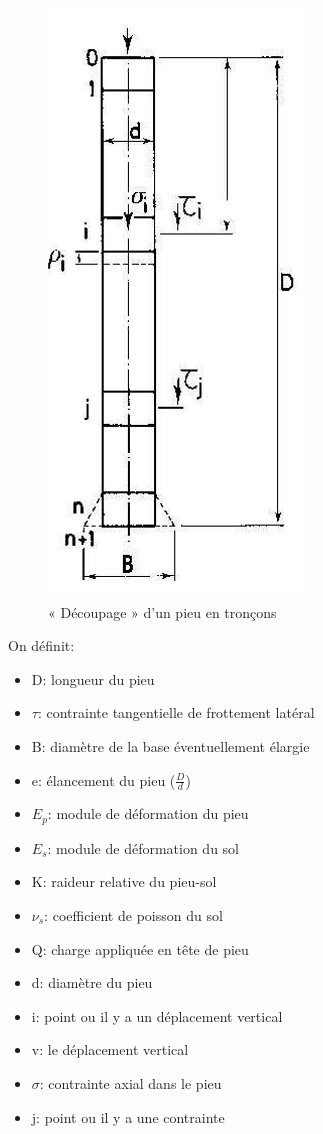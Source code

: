         \begin{figure}[ht]
            \centering
            \includegraphics[scale=0.8]{Holeyman/images/H43.PNG}
            \caption{« Découpage » d’un pieu en tronçons }
        \end{figure}
        
        On définit:
        
        \begin{itemize}
             \item D: longueur du pieu
             \item $\tau$: contrainte tangentielle de frottement latéral 
             \item B: diamètre de la base éventuellement élargie 
             \item e: élancement du pieu ($\frac{D}{d}$) 
             \item $E_p$: module de déformation du pieu 
             \item $E_s$: module de déformation du sol 
             \item K: raideur relative du pieu-sol  
             \item $\nu_s$: coefficient de poisson du sol  
             \item Q: charge appliquée en tête de pieu  
             \item d: diamètre du pieu  
             \item i: point ou il y a un déplacement vertical  
             \item v: le déplacement vertical  
             \item $\sigma$: contrainte axial dans le pieu  
             \item j: point ou il y a une contrainte  
        \end{itemize}
        
